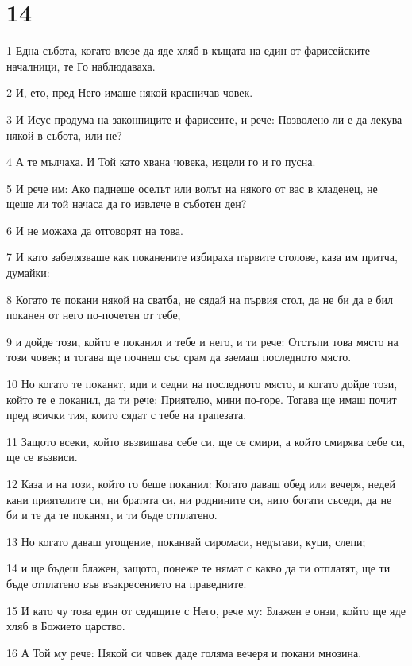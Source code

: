 \chapter{14}

\par 1 Една събота, когато влезе да яде хляб в къщата на един от фарисейските началници, те Го наблюдаваха.
\par 2 И, ето, пред Него имаше някой красничав човек.
\par 3 И Исус продума на законниците и фарисеите, и рече: Позволено ли е да лекува някой в събота, или не?
\par 4 А те мълчаха. И Той като хвана човека, изцели го и го пусна.
\par 5 И рече им: Ако паднеше оселът или волът на някого от вас в кладенец, не щеше ли той начаса да го извлече в съботен ден?
\par 6 И не можаха да отговорят на това.
\par 7 И като забелязваше как поканените избираха първите столове, каза им притча, думайки:
\par 8 Когато те покани някой на сватба, не сядай на първия стол, да не би да е бил поканен от него по-почетен от тебе,
\par 9 и дойде този, който е поканил и тебе и него, и ти рече: Отстъпи това място на този човек; и тогава ще почнеш със срам да заемаш последното място.
\par 10 Но когато те поканят, иди и седни на последното място, и когато дойде този, който те е поканил, да ти рече: Приятелю, мини по-горе. Тогава ще имаш почит пред всички тия, които сядат с тебе на трапезата.
\par 11 Защото всеки, който възвишава себе си, ще се смири, а който смирява себе си, ще се възвиси.
\par 12 Каза и на този, който го беше поканил: Когато даваш обед или вечеря, недей кани приятелите си, ни братята си, ни роднините си, нито богати съседи, да не би и те да те поканят, и ти бъде отплатено.
\par 13 Но когато даваш угощение, поканвай сиромаси, недъгави, куци, слепи;
\par 14 и ще бъдеш блажен, защото, понеже те нямат с какво да ти отплатят, ще ти бъде отплатено във възкресението на праведните.
\par 15 И като чу това един от седящите с Него, рече му: Блажен е онзи, който ще яде хляб в Божието царство.
\par 16 А Той му рече: Някой си човек даде голяма вечеря и покани мнозина.
